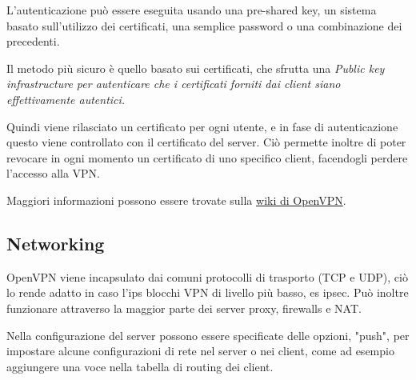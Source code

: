 L'autenticazione può essere eseguita usando una pre-shared key, un sistema basato sull'utilizzo dei certificati, una semplice password o una combinazione dei precedenti.

Il metodo più sicuro è quello basato sui certificati, che sfrutta una \it{Public key infrastructure} per autenticare che i certificati forniti dai client siano effettivamente autentici.

Quindi viene rilasciato un certificato per ogni utente, e in fase di autenticazione questo viene controllato con il certificato del server. Ciò permette inoltre di poter revocare in ogni momento un certificato di uno specifico client, facendogli perdere l'accesso alla VPN.


Maggiori informazioni possono essere trovate sulla \href{https://community.openvpn.net/openvpn/wiki/How_does_PKI_work}{wiki di OpenVPN}.



\subsection{Networking}

OpenVPN viene incapsulato dai comuni protocolli di trasporto (TCP e UDP), ciò lo rende adatto in caso l'ips blocchi VPN di livello più basso, es ipsec. Può inoltre funzionare attraverso la maggior parte dei server proxy, firewalls e NAT.


Nella configurazione del server possono essere specificate delle opzioni, "push", per impostare alcune configurazioni di rete nel server o nei client, come ad esempio aggiungere una voce nella tabella di routing dei client.

